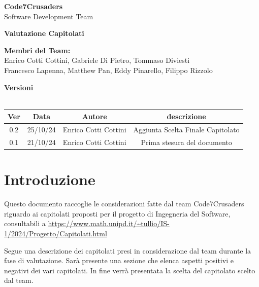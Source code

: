 \documentclass{article}
\begin{document}
\begin{titlepage}
    {\Huge \textbf{Code7Crusaders}}\\
    \vspace{0.5cm}
    {\Large Software Development Team}\\
    \vspace{2cm}
    
    {\large \textbf{Valutazione Capitolati}}\\
    \vspace{5cm}

    \textbf{Membri del Team:}\\
    Enrico Cotti Cottini, Gabriele Di Pietro, Tommaso Diviesti \\
    Francesco Lapenna, Matthew Pan, Eddy Pinarello, Filippo Rizzolo \\
    \vspace{0.5cm}
    
    \vspace{1cm}
\end{titlepage}

\newpage
\begin{center}
    \textbf{Versioni}
    \\
    \\
    \begin{tabular}{|c|c|c|c|}
        \hline
        \textbf{Ver} & \textbf{Data} & \textbf{Autore} & \textbf{descrizione}\\
        \hline
        0.2 & 25/10/24 & Enrico Cotti Cottini & Aggiunta Scelta Finale Capitolato \\
        0.1 & 21/10/24 & Enrico Cotti Cottini & Prima stesura del documento \\
        \hline
    \end{tabular}
\end{center}
\newpage

\tableofcontents
\newpage

\section{Introduzione}

Questo documento raccoglie le considerazioni fatte dal team Code7Crusaders 
riguardo ai capitolati proposti per il progetto di Ingegneria del Software, 
consultabili a 
\newline
\url{https://www.math.unipd.it/~tullio/IS-1/2024/Progetto/Capitolati.html}
\newline

Segue una descrizione dei capitolati presi in considerazione dal team durante la fase di valutazione.
Sarà presente una sezione che elenca aspetti positivi e negativi dei vari capitolati.
In fine verrà presentata la scelta del capitolato scelto dal team.
\end{document}
